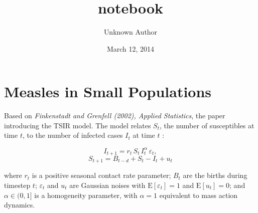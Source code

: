 \documentclass[letterpaper,10pt,english]{/Users/qcaudron/anaconda/lib/python2.7/site-packages/Sphinx-1.2b1-py2.7.egg/sphinx/texinputs/sphinxhowto}
\title{notebook}
\date{March 12, 2014}
\author{Unknown Author}
\begin{document}
        
            \maketitle
        

        


        
        \part{Measles in Small Populations}Based on \emph{Finkenstadt and Grenfell (2002), Applied Statistics}, the
paper introducing the TSIR model. The model relates $S_t$, the number of
susceptibles at time $t$, to the number of infected cases $I_t$ at time
$t$ :

\[
I_{t+1} = r_t \, S_t \, I_t^\alpha \, \varepsilon_t,
\] \[
S_{t+1} = B_{t-d} + S_t - I_t + u_t
\]

where $r_t$ is a positive seasonal contact rate parameter; $B_t$ are the
births during timestep $t$; $\varepsilon_t$ and $u_t$ are Gaussian
noises with $\mathrm{E}[\varepsilon_t] = 1$ and $\mathrm{E}[u_t] = 0$;
and $\alpha \in (0, 1]$ is a homogeneity parameter, with $\alpha = 1$
equivalent to mass action dynamics.

\end{document}
